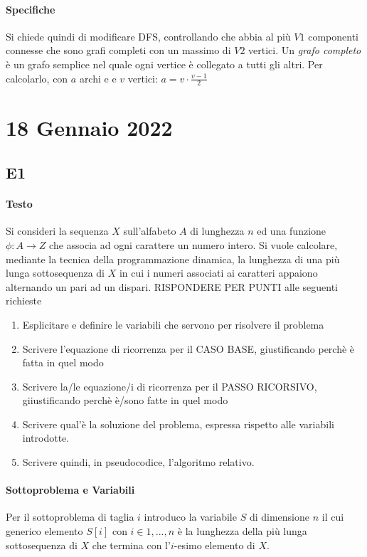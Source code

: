 \documentclass[12pt, a4paper, openany]{book}
\begin{document}
\paragraph*{Specifiche}
Si chiede quindi di modificare DFS, controllando che abbia al più $V1$ componenti connesse che sono grafi completi con un massimo di $V2$ vertici.
Un \emph{grafo completo} è un grafo semplice nel quale ogni vertice è collegato a tutti gli altri. Per calcolarlo, con $a$ archi e e $v$ vertici: $a = v\cdot \frac{v-1}{2}$  
\section{18 Gennaio 2022}
\subsection{E1}
\paragraph*{Testo}
Si consideri la sequenza $X$ sull'alfabeto $A$ di lunghezza $n$ ed una funzione $\phi:A\to Z$ che associa ad ogni carattere un numero intero.
Si vuole calcolare, mediante la tecnica della programmazione dinamica, la lunghezza di una più lunga sottosequenza di $X$ in cui i numeri associati ai caratteri appaiono alternando un pari ad un dispari.
RISPONDERE PER PUNTI alle seguenti richieste
\begin{enumerate}
	\item Esplicitare e definire le variabili che servono per risolvere il problema
	\item Scrivere l'equazione di ricorrenza per il CASO BASE, giustificando perchè è fatta in quel modo
	\item Scrivere la/le equazione/i di ricorrenza per il PASSO RICORSIVO, giiustificando perchè è/sono fatte in quel modo
	\item Scrivere qual'è la soluzione del problema, espressa rispetto alle variabili introdotte.
	\item Scrivere quindi, in pseudocodice, l'algoritmo relativo.
\end{enumerate}

\paragraph*{Sottoproblema e Variabili}
Per il sottoproblema di taglia $i$ introduco la variabile $S$ di dimensione $n$ il cui generico elemento
$S[i]$ con $i\in {1,...,n}$ è la lunghezza della più lunga sottosequenza di $X$ che termina con l'$i$-esimo elemento di $X$.
\end{document}
